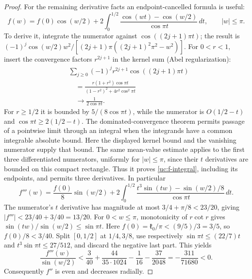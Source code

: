 \begin{proof}
For the remaining derivative facts an endpoint-cancelled formula is
useful:
\begin{equation}\label{uc:f-integral}
 f(w)=f(0)\cos(w/2)+2\int_0^{1/2}
       \frac{\cos(wt)-\cos(w/2)}{\cos\pi t}\,dt,\qquad |w|\leq\pi.
\end{equation}
To derive it, integrate the numerator against $\cos((2j+1)\pi t)$;
the result is
$(-1)^j\cos(w/2)w^2/[(2j+1)\pi((2j+1)^2\pi^2-w^2)]$.
For $0<r<1$, insert the convergence factors $r^{2j+1}$ in the
kernel sum (Abel regularization):
\[
 \begin{aligned}
 &\sum_{j\geq0}(-1)^jr^{2j+1}\cos((2j+1)\pi t)\\
 &\quad=\frac{r(1+r^2)\cos\pi t}{(1-r^2)^2+4r^2\cos^2\pi t}\\
 &\quad\longrightarrow\frac1{2\cos\pi t}.
 \end{aligned}
\]
For $r\geq1/2$ it is bounded by $5/(8\cos\pi t)$, while the
numerator is $O(1/2-t)$ and $\cos\pi t\geq2(1/2-t)$.
The dominated-convergence theorem permits passage of a pointwise
limit through an integral when the integrands have a common integrable
absolute bound. Here the displayed kernel bound and the vanishing
numerator supply that bound. The same mean-value estimate applies to
the first three differentiated numerators, uniformly for $|w|\leq\pi$,
since their $t$ derivatives are bounded on this compact rectangle.
Thus it proves \eqref{uc:f-integral}, including its endpoints, and
permits three derivatives. In particular
\[
 f'''(w)=\frac{f(0)}8\sin(w/2)
 +2\int_0^{1/2}\frac{t^3\sin(tw)-\sin(w/2)/8}{\cos\pi t}\,dt.
\]
The numerator's $t$ derivative has magnitude at most
$3/4+\pi/8<23/20$, giving $|f'''|<23/40+3/40=13/20$.
For $0<w\leq\pi$, monotonicity of $r\cot r$ gives
$\sin(tw)/\sin(w/2)\leq\sin\pi t$. Here $f(0)=\mathfrak k_0/\pi<(9/5)/3=3/5$, so $f(0)/8<3/40$. Split
$[0,1/2]$ at $1/4,3/8$, use respectively $\sin\pi t\leq(22/7)t$
and $t^3\sin\pi t\leq27/512$, and discard the negative last part.
This yields
\[
 \frac{f'''(w)}{\sin(w/2)}
 <\frac3{40}+\frac{44}{35\cdot1024}-\frac1{16}-\frac{37}{2048}
 =-\frac{311}{71680}<0.
\]
Consequently $f''$ is even and decreases radially.


\end{proof}
